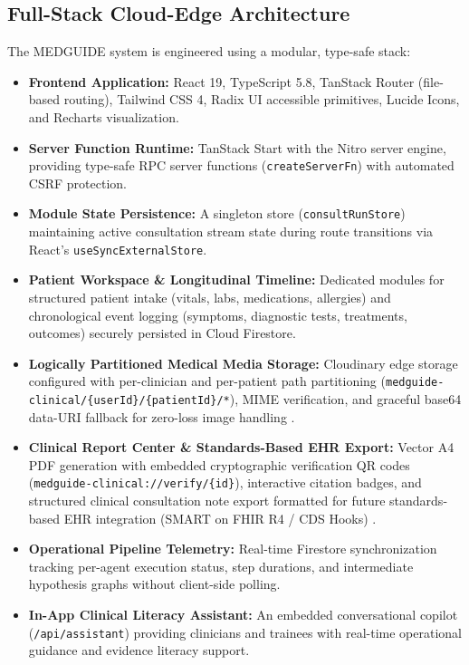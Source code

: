 \documentclass[journal,10pt,twocolumn]{IEEEtran}
\begin{document}
\subsection{Full-Stack Cloud-Edge Architecture}
The MEDGUIDE system is engineered using a modular, type-safe stack:
\begin{itemize}
    \item \textbf{Frontend Application:} React 19, TypeScript 5.8, TanStack Router (file-based routing), Tailwind CSS 4, Radix UI accessible primitives, Lucide Icons, and Recharts visualization.
    \item \textbf{Server Function Runtime:} TanStack Start with the Nitro server engine, providing type-safe RPC server functions (\texttt{createServerFn}) with automated CSRF protection.
    \item \textbf{Module State Persistence:} A singleton store (\texttt{consultRunStore}) maintaining active consultation stream state during route transitions via React's \texttt{useSyncExternalStore}.
    \item \textbf{Patient Workspace \& Longitudinal Timeline:} Dedicated modules for structured patient intake (vitals, labs, medications, allergies) and chronological event logging (symptoms, diagnostic tests, treatments, outcomes) securely persisted in Cloud Firestore.
    \item \textbf{Logically Partitioned Medical Media Storage:} Cloudinary edge storage configured with per-clinician and per-patient path partitioning (\texttt{medguide-clinical/}\allowbreak\texttt{\{userId\}/}\allowbreak\texttt{\{patientId\}/*}), MIME verification, and graceful base64 data-URI fallback for zero-loss image handling \cite{cloudinary2024}.
    \item \textbf{Clinical Report Center \& Standards-Based EHR Export:} Vector A4 PDF generation with embedded cryptographic verification QR codes (\texttt{medguide-clinical:}\allowbreak\texttt{//verify/}\allowbreak\texttt{\{id\}}), interactive citation badges, and structured clinical consultation note export formatted for future standards-based EHR integration (SMART on FHIR R4 / CDS Hooks) \cite{weed1968medical, mandel2016smart, cdshooks2024}.
    \item \textbf{Operational Pipeline Telemetry:} Real-time Firestore synchronization tracking per-agent execution status, step durations, and intermediate hypothesis graphs without client-side polling.
    \item \textbf{In-App Clinical Literacy Assistant:} An embedded conversational copilot (\texttt{/api/assistant}) providing clinicians and trainees with real-time operational guidance and evidence literacy support.
\end{itemize}
\end{document}
